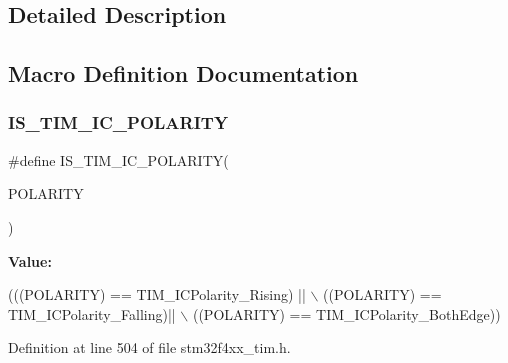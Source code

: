 \subsection{Detailed Description}


\subsection{Macro Definition Documentation}
\mbox{\label{group___t_i_m___input___capture___polarity_ga6aff2fe442fd9662a0bb8731134cda89}} 
\subsubsection{\texorpdfstring{I\+S\+\_\+\+T\+I\+M\+\_\+\+I\+C\+\_\+\+P\+O\+L\+A\+R\+I\+TY}{IS\_TIM\_IC\_POLARITY}}
{\footnotesize\ttfamily \#define I\+S\+\_\+\+T\+I\+M\+\_\+\+I\+C\+\_\+\+P\+O\+L\+A\+R\+I\+TY(\begin{DoxyParamCaption}\item[{}]{P\+O\+L\+A\+R\+I\+TY }\end{DoxyParamCaption})}

{\bfseries Value\+:}
\begin{DoxyCode}
(((POLARITY) == TIM\_ICPolarity\_Rising) || \(\backslash\)
                                      ((POLARITY) == TIM\_ICPolarity\_Falling)|| \(\backslash\)
                                      ((POLARITY) == TIM\_ICPolarity\_BothEdge))
\end{DoxyCode}


Definition at line 504 of file stm32f4xx\+\_\+tim.\+h.

